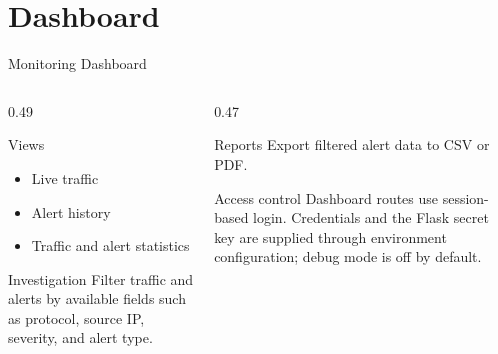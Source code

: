 \documentclass{SKP-beamer}
\begin{document}
\section{Dashboard}
\begin{frame}{Monitoring Dashboard}
\begin{columns}[T]
\begin{column}{0.49\textwidth}
\begin{block}{Views}
\begin{itemize}
  \item Live traffic
  \item Alert history
  \item Traffic and alert statistics
\end{itemize}
\end{block}
\begin{block}{Investigation}
Filter traffic and alerts by available fields such as protocol, source IP, severity, and alert type.
\end{block}
\end{column}
\begin{column}{0.47\textwidth}
\begin{exampleblock}{Reports}
Export filtered alert data to CSV or PDF.
\end{exampleblock}
\begin{alertblock}{Access control}
Dashboard routes use session-based login. Credentials and the Flask secret key are supplied through environment configuration; debug mode is off by default.
\end{alertblock}
\end{column}
\end{columns}
\end{frame}
\end{document}
